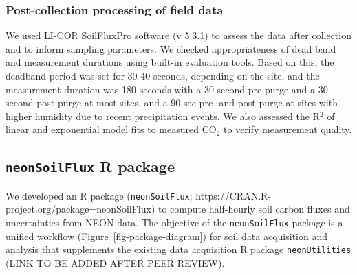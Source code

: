 \documentclass[
  letterpaper,
  DIV=11,
  numbers=noendperiod]{scrartcl}
\begin{document}
\normalsize

\subsubsection{Post-collection processing of field
data}\label{post-collection-processing-of-field-data}

We used LI-COR SoilFluxPro software (v 5.3.1) to assess the data after
collection and to inform sampling parameters. We checked appropriateness
of dead band and measurement durations using built-in evaluation tools.
Based on this, the deadband period was set for 30-40 seconds, depending
on the site, and the measurement duration was 180 seconds with a 30
second pre-purge and a 30 second post-purge at most sites, and a 90 sec
pre- and post-purge at sites with higher humidity due to recent
precipitation events. We also assessed the R\(^{2}\) of linear and
exponential model fits to measured CO\(_{2}\) to verify measurement
quality.

\subsection{\texorpdfstring{\texttt{neonSoilFlux} R
package}{neonSoilFlux R package}}\label{neonsoilflux-r-package}

We developed an R package (\texttt{neonSoilFlux};
https://CRAN.R-project.org/package=neonSoilFlux) to compute half-hourly
soil carbon fluxes and uncertainties from NEON data. The objective of
the \texttt{neonSoilFlux} package is a unified workflow
(Figure~\ref{fig-package-diagram}) for soil data acquisition and
analysis that supplements the existing data acquisition R package
\texttt{neonUtilities} (LINK TO BE ADDED AFTER PEER REVIEW).
\end{document}
